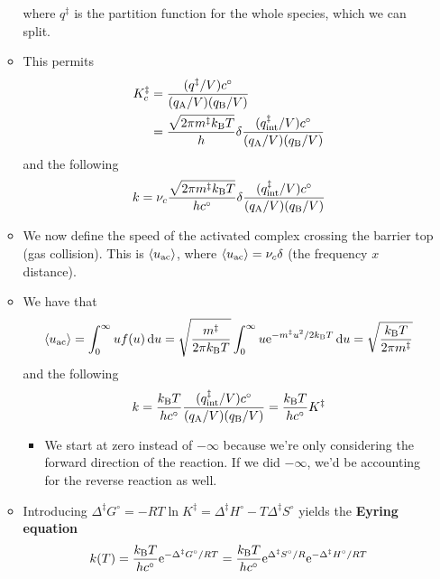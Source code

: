 \documentclass[../notes.tex]{subfiles}
\begin{document}
\begin{itemize}
\begin{itemize}
        where $q^\ddagger$ is the partition function for the whole species, which we can split.
        \item This permits
        \begin{align*}
            K_c^\ddagger &= \frac{(q^\ddagger/V)c^\circ}{(q_{\ce{A}}/V)(q_{\ce{B}}/V)}\\
            &= \frac{\sqrt{2\pi m^\ddagger\kB T}}{h}\delta\frac{(q_\text{int}^\ddagger/V)c^\circ}{(q_{\ce{A}}/V)(q_{\ce{B}}/V)}
        \end{align*}
        and the following
        \begin{equation*}
            k = \nu_c\frac{\sqrt{2\pi m^\ddagger\kB T}}{hc^\circ}\delta\frac{(q_\text{int}^\ddagger/V)c^\circ}{(q_{\ce{A}}/V)(q_{\ce{B}}/V)}
        \end{equation*}
        \item We now define the speed of the activated complex crossing the barrier top (gas collision). This is $\prb{u_\text{ac}}$, where $\prb{u_\text{ac}}=\nu_c\delta$ (the frequency $x$ distance).
        \item We have that
        \begin{equation*}
            \prb{u_\text{ac}} = \int_0^\infty uf(u)\dd{u}
            = \sqrt{\frac{m^\ddagger}{2\pi\kB T}}\int_0^\infty u\e[-m^\ddagger u^2/2\kB T]\dd{u}
            = \sqrt{\frac{\kB T}{2\pi m^\ddagger}}
        \end{equation*}
        and the following
        \begin{equation*}
            k = \frac{\kB T}{hc^\circ}\frac{(q_\text{int}^\ddagger/V)c^\circ}{(q_{\ce{A}}/V)(q_{\ce{B}}/V)}
            = \frac{\kB T}{hc^\circ}K^\ddagger
        \end{equation*}
        \begin{itemize}
            \item We start at zero instead of $-\infty$ because we're only considering the forward direction of the reaction. If we did $-\infty$, we'd be accounting for the reverse reaction as well.
        \end{itemize}
        \item Introducing $\Delta^\ddagger G^\circ=-RT\ln K^\ddagger=\Delta^\ddagger H^\circ-T\Delta^\ddagger S^\circ$ yields the \textbf{Eyring equation}
        \begin{equation*}
            k(T) = \frac{\kB T}{hc^\circ}\e[-\Delta^\ddagger G^\circ/RT]
            = \frac{\kB T}{hc^\circ}\e[\Delta^\ddagger S^\circ/R]\e[-\Delta^\ddagger H^\circ/RT]
        \end{equation*}

\end{itemize}
\end{itemize}
\end{document}
